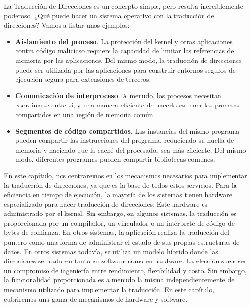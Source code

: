 \documentclass[10pt]{book}
\begin{document}
La Traducción de Direcciones es un concepto simple, pero resulta increíblemente poderoso. ¿Qué puede hacer un sistema operativo con la traducción de direcciones? Vamos a listar unos ejemplos:
\begin{itemize}
\item \textbf{Aislamiento del proceso}. La protección del kernel y otras aplicaciones contra código malicioso requiere la capacidad de limitar las referencias de memoria por las aplicaciones. Del mismo modo, la traducción de direcciones puede ser utilizada por las aplicaciones para construir entornos seguros de ejecución segura para extensiones de terceros.

\item \textbf{Comunicación de interproceso}. A menudo, los procesos necesitan coordinarse entre sí, y una manera eficiente de hacerlo es tener los procesos compartidos en una región de memoria común.

\item \textbf{Segmentos de código compartidos}. Las instancias del mismo programa pueden compartir las instrucciones del programa, reduciendo su huella de memoria y haciendo que la caché del procesador sea más eficiente. Del mismo modo, diferentes programas pueden compartir bibliotecas comunes.
\end{itemize}

En este capítulo, nos centraremos en los mecanismos necesarios para implementar la traducción de direcciones, ya que es la base de todos estos servicios. Para la eficiencia en tiempo de ejecución, la mayoría de los sistemas tienen hardware especializado para hacer traducción de direcciones; Este hardware es administrado por el kernel. Sin embargo, en algunos sistemas, la traducción es proporcionada por un compilador, un vinculador o un intérprete de código de bytes de confianza. En otros sistemas, la aplicación realiza la traducción del puntero como una forma de administrar el estado de sus propias estructuras de datos. En otros sistemas todavía, se utiliza un modelo híbrido donde las direcciones se traducen tanto en software como en hardware. La elección suele ser un compromiso de ingeniería entre rendimiento, flexibilidad y costo. Sin embargo, la funcionalidad proporcionada es a menudo la misma independientemente del mecanismo utilizado para implementar la traducción. En este capítulo, cubriremos una gama de mecanismos de hardware y software.
\end{document}
